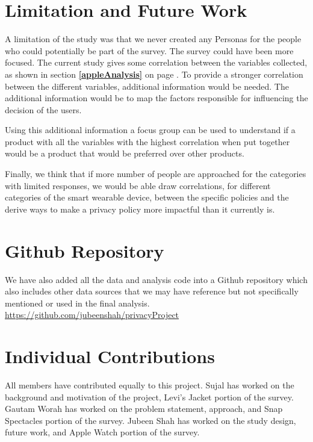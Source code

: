 \documentclass[sigconf]{acmart}
\begin{document}
\section{Limitation and Future Work} \label{limitationAndFutureWork}
A limitation of the study was that we never created any Personas for the people who could potentially be part of the survey. The survey could have been more focused. The current study gives some correlation between the variables collected, as shown in section \textbf{\ref{appleAnalysis}} on page \textbf{\pageref{fig:changeDos}}. To provide a stronger correlation between the different variables, additional information would be needed. The additional information would be to map the factors responsible for influencing the decision of the users.  

Using this additional information a focus group can be used to understand if a product with all the variables with the highest correlation when put together would be a product that would be preferred over other products.

Finally, we think that if more number of people are approached for the categories with limited responses, we would be able draw correlations, for different categories of the smart wearable device, between the specific policies and the derive ways to make a privacy policy more impactful than it currently is. 





\appendix

\section{Github Repository}

We have also added all the data and analysis code into a Github repository which also includes other data sources that we may have reference but not specifically mentioned or used in the final analysis. \url{https://github.com/jubeenshah/privacyProject}

\section{Individual Contributions}

All members have contributed equally to this project. Sujal has worked on the background and motivation of the project, Levi's Jacket portion of the survey. Gautam Worah has worked on the problem statement, approach, and Snap Spectacles portion of the survey. Jubeen Shah has worked on the study design, future work, and Apple Watch portion of the survey. 
\end{document}
